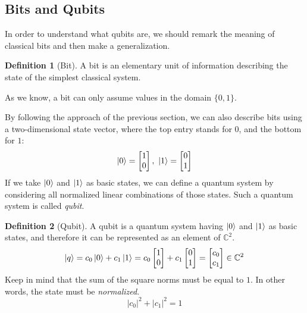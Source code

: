 \documentclass[12pt,a4paper]{report}
\theoremstyle{definition}
\newtheorem{definition}{Definition}[section]
\theoremstyle{definition}
\theoremstyle{definition}
\begin{document}
\subsection{Bits and Qubits}
In order to understand what qubits are, we should remark the meaning of classical bits and then make a generalization.
\begin{definition}[Bit]
A bit is an elementary unit of information describing the state of the simplest classical system.
\end{definition}
As we know, a bit can only assume values in the domain $\{0,1\}$.
\begin{center}
\end{center}
By following the approach of the previous section, we can also describe bits using a two-dimensional state vector, where the top entry stands for $0$, and the bottom for $1$:
\begin{equation*}
    \ket{0}=\begin{bmatrix}
        1\\
        0
    \end{bmatrix},\ 
    \ket{1}=\begin{bmatrix}
        0\\
        1
    \end{bmatrix}
\end{equation*}
If we take $\ket{0}$ and $\ket{1}$ as basic states, we can define a quantum system by considering all normalized linear combinations of those states. Such a quantum system is called \textit{qubit}.
\begin{definition}[Qubit]
A qubit is a quantum system having $\ket{0}$ and $\ket{1}$ as basic states, and therefore it can be represented as an element of $\mathbb{C}^2$.
\begin{equation*}
    \ket{q}=c_0\ket{0}+c_1\ket{1}=c_0\begin{bmatrix}
        1\\
        0
    \end{bmatrix}+c_1\begin{bmatrix}
        0\\
        1
    \end{bmatrix}=\begin{bmatrix}
        c_0\\
        c_1
    \end{bmatrix} \in \mathbb{C}^2
\end{equation*}
Keep in mind that the sum of the square norms must be equal to $1$. In other words, the state must be \textit{normalized}.
\begin{equation*}
    \left|c_0\right|^2+\left|c_1\right|^2=1
\end{equation*}
\end{definition}
\end{document}
